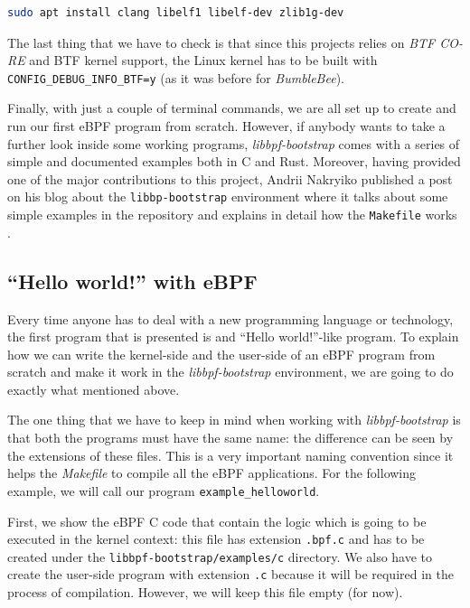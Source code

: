\begin{lstlisting}[language=bash, caption={libbpf-bootstrap install dependencies command}]
	sudo apt install clang libelf1 libelf-dev zlib1g-dev
\end{lstlisting}

The last thing that we have to check is that since this projects relies on \textit{BTF CO-RE} and BTF kernel support, the  Linux kernel has to be built with \verb|CONFIG_DEBUG_INFO_BTF=y| (as it was before for \textit{BumbleBee}).

Finally, with just a couple of terminal commands, we are all set up to create and run our first eBPF program from scratch.
However, if anybody wants to take a further look inside some working programs, \textit{libbpf-bootstrap} comes with a series of simple and documented examples both in C and Rust.
Moreover, having provided one of the major contributions to this project, Andrii Nakryiko published a post on his blog about the \verb|libbp-bootstrap| environment where it talks about some simple examples in the repository and explains in detail how the \verb|Makefile| works \cite{ANlibbpfbootstrap}.

\subsection{``Hello world!'' with eBPF}

Every time anyone has to deal with a new programming language or technology, the first program that is presented is and ``Hello world!''-like program.
To explain how we can write the kernel-side and the user-side of an eBPF program from scratch and make it work in the \textit{libbpf-bootstrap} environment, we are going to do exactly what mentioned above.

The one thing that we have to keep in mind when working with \textit{libbpf-bootstrap} is that both the programs must have the same name: the difference can be seen by the extensions of these files.
This is a very important naming convention since it helps the \textit{Makefile} to compile all the eBPF applications.
For the following example, we will call our program \verb|example_helloworld|.

First, we show the eBPF C code that contain the logic which is going to be executed in the kernel context: this file has extension \verb|.bpf.c| and has to be created under the \verb|libbpf-bootstrap/examples/c| directory.
We also have to create the user-side program with extension \verb|.c| because it will be required in the process of compilation.
However, we will keep this file empty (for now).

